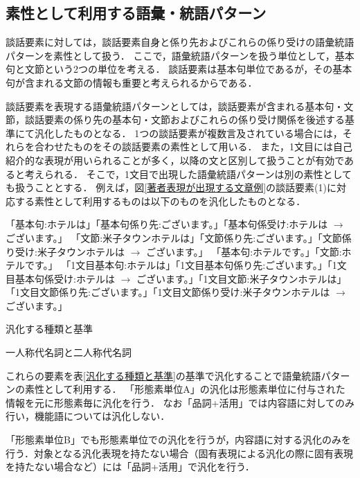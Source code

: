 \documentclass[japanese]{jnlp_1.4}
\begin{document}
\subsection{素性として利用する語彙・統語パターン}

談話要素に対しては，談話要素自身と係り先およびこれらの係り受けの語彙統語パターンを素性として扱う．
ここで，語彙統語パターンを扱う単位として，基本句と文節という2つの単位を考える．
談話要素は基本句単位であるが，その基本句が含まれる文節の情報も重要と考えられるからである．

談話要素を表現する語彙統語パターンとしては，談話要素が含まれる基本句・文節，談話要素の係り先の基本句・文節およびこれらの係り受け関係を後述する基準にて汎化したものとなる．
1つの談話要素が複数言及されている場合には，それらを合わせたものをその談話要素の素性として用いる．
また，1文目には自己紹介的な表現が用いられることが多く，以降の文と区別して扱うことが有効であると考えられる．
そこで，1文目で出現した語彙統語パターンは別の素性としても扱うこととする．
例えば，図\ref{著者表現が出現する文章例}の談話要素(1)に対応する素性として利用するものは以下のものを汎化したものとなる．

\begin{screen}
 「基本句:ホテルは」「基本句係り先:ございます。」「基本句係受け:ホテルは $\rightarrow$ ございます。」
「文節:米子タウンホテルは」「文節係り先:ございます。」「文節係り受け:米子タウンホテルは $\rightarrow$ ございます。」
「基本句:ホテルです。」「文節:ホテルです。」 
「1文目基本句:ホテルは」「1文目基本句係り先:ございます。」「1文目基本句係受け:ホテルは $\rightarrow$ ございます。」「1文目文節:米子タウンホテルは」「1文目文節係り先:ございます。」「1文目文節係り受け:米子タウンホテルは $\rightarrow$ ございます。」
\end{screen}

\begin{table}[t]
  \caption{汎化する種類と基準}
  \label{汎化する種類と基準}

\end{table}
\begin{table}[t]
  \caption{一人称代名詞と二人称代名詞}
\label{一人称代名詞}

\end{table}


これらの要素を表\ref{汎化する種類と基準}の基準で汎化することで語彙統語パターンの素性として利用する．
「形態素単位A」の汎化は形態素単位に付与された情報を元に形態素毎に汎化を行う．
なお「品詞+活用」では内容語に対してのみ行い，機能語については汎化しない．

「形態素単位B」でも形態素単位での汎化を行うが，内容語に対する汎化のみを行う．対象となる汎化表現を持たない場合（固有表現による汎化の際に固有表現を持たない場合など）には「品詞+活用」で汎化を行う．
\end{document}
